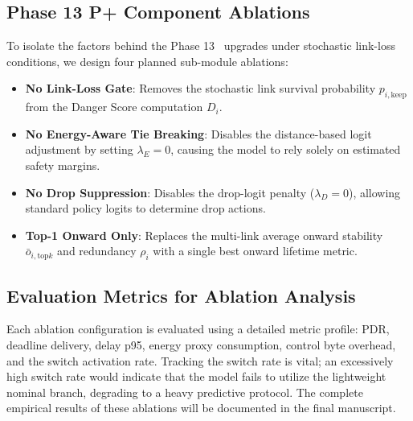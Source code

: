 \subsection{Phase 13 P+ Component Ablations}
To isolate the factors behind the Phase 13 \method\ upgrades under stochastic link-loss conditions, we design four planned sub-module ablations:
\begin{itemize}
    \item \textbf{No Link-Loss Gate}: Removes the stochastic link survival probability $p_{i,\mathrm{keep}}$ from the Danger Score computation $D_i$.
    \item \textbf{No Energy-Aware Tie Breaking}: Disables the distance-based logit adjustment by setting $\lambda_E = 0$, causing the model to rely solely on estimated safety margins.
    \item \textbf{No Drop Suppression}: Disables the drop-logit penalty ($\lambda_D = 0$), allowing standard policy logits to determine drop actions.
    \item \textbf{Top-1 Onward Only}: Replaces the multi-link average onward stability $\bar{o}_{i,\mathrm{top}k}$ and redundancy $\rho_i$ with a single best onward lifetime metric.
\end{itemize}

\subsection{Evaluation Metrics for Ablation Analysis}
Each ablation configuration is evaluated using a detailed metric profile: PDR, deadline delivery, delay p95, energy proxy consumption, control byte overhead, and the switch activation rate. Tracking the switch rate is vital; an excessively high switch rate would indicate that the model fails to utilize the lightweight nominal branch, degrading to a heavy predictive protocol. The complete empirical results of these ablations will be documented in the final manuscript.

